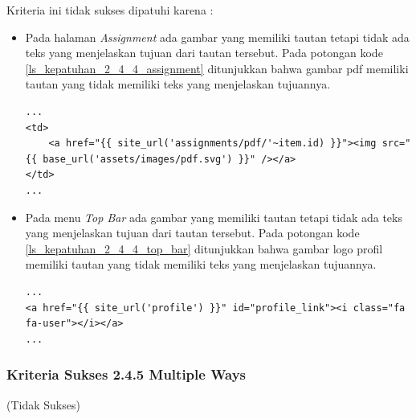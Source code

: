 \documentclass[a4paper,twoside]{article}
\begin{document}
\begin{enumerate}
		Kriteria ini tidak sukses dipatuhi karena :
		\begin{itemize}
			\item Pada halaman \textit{Assignment} ada gambar yang memiliki tautan tetapi tidak ada teks yang menjelaskan tujuan dari tautan tersebut. Pada potongan kode \ref{ls_kepatuhan_2_4_4_assignment} ditunjukkan bahwa gambar pdf memiliki tautan yang tidak memiliki teks yang menjelaskan tujuannya.
			\begin{lstlisting}[basicstyle=\ttfamily, frame=single,
			columns=fullflexible, keepspaces=true, breaklines=true, label=ls_kepatuhan_2_4_4_assignment, caption=Kriteria Sukses 2.4.4 - Gambar PDF]
...
<td>
	<a href="{{ site_url('assignments/pdf/'~item.id) }}"><img src="{{ base_url('assets/images/pdf.svg') }}" /></a>
</td>
...
			\end{lstlisting}
			
			\item Pada menu \textit{Top Bar} ada gambar yang memiliki tautan tetapi tidak ada teks yang menjelaskan tujuan dari tautan tersebut. Pada potongan kode \ref{ls_kepatuhan_2_4_4_top_bar} ditunjukkan bahwa gambar logo profil memiliki tautan yang tidak memiliki teks yang menjelaskan tujuannya.
			\begin{lstlisting}[basicstyle=\ttfamily, frame=single,
			columns=fullflexible, keepspaces=true, breaklines=true, label=ls_kepatuhan_2_4_4_top_bar, caption=Kriteria Sukses 2.4.4 - Gambar Logo Profile]
...
<a href="{{ site_url('profile') }}" id="profile_link"><i class="fa fa-user"></i></a>
...
			\end{lstlisting}
			
		\end{itemize}
		
		\subsubsection*{Kriteria Sukses 2.4.5 Multiple Ways}
		\label{subsubsec:kepatuhan_kriteria_2.4.5}
		(Tidak Sukses) \\
		

\end{enumerate}
\end{document}
